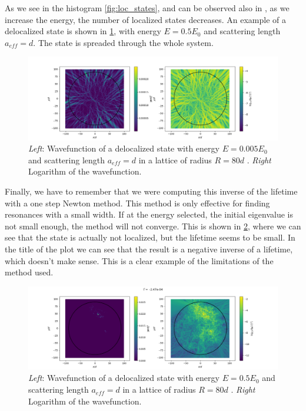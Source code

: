 As we see in the histogram \cref{fig:loc_states}, and can be observed also in \cite{antezzaQuantitativeStudyTwo2010}, as we increase the energy, the number of localized states decreases. An example of a delocalized state is shown in \cref{fig:high_energy}, with energy $E=0.5E_0$ and scattering length $a_{eff}=d$. The state is spreaded through the whole system.

\begin{figure}[ht]
    \centering
    \includegraphics[width=1\linewidth]{img/high_energy0.5.png}
    \caption{\textit{Left}: Wavefunction of a delocalized state with energy $E=0.005E_0$ and scattering length $a_{eff}=d$ in a lattice of radius $R=80d$ . \textit{Right} Logarithm of the wavefunction. }
    \label{fig:high_energy}
\end{figure}

Finally, we have to remember that we were computing this inverse of the lifetime with a one step Newton method. This method is only effective for finding resonances with a small width. If at the energy selected, the initial eigenvalue is not small enough, the method will not converge. This is shown in \cref{fig:weird_state}, where we can see that the state is actually not localized, but the lifetime seems to be small. In the title of the plot we can see that the result is a negative inverse of a lifetime, which doesn't make sense. This is a clear example of the limitations of the method used.

\begin{figure}[ht]
    \centering
    \includegraphics[width=1\linewidth]{img/Weird_semiloc.png}
    \caption{\textit{Left}: Wavefunction of a delocalized state with energy $E=0.5E_0$ and scattering length $a_{eff}=d$ in a lattice of radius $R=80d$ . \textit{Right} Logarithm of the wavefunction. }
    \label{fig:weird_state}
\end{figure}

